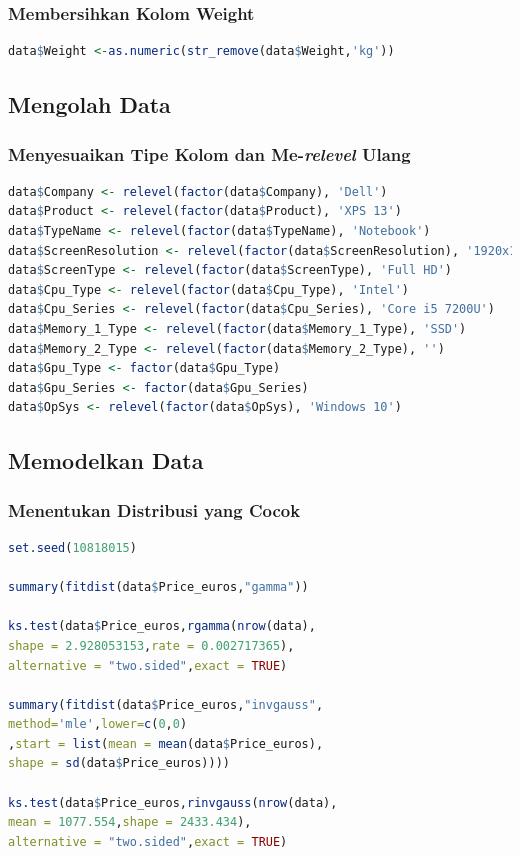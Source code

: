 \documentclass[12pt]{article}
\begin{document}
\subsubsection{Membersihkan Kolom Weight}
\begin{lstlisting}[language=R]
data$Weight <-as.numeric(str_remove(data$Weight,'kg'))
\end{lstlisting}
\subsection{Mengolah Data}
\subsubsection{Menyesuaikan Tipe Kolom dan Me-\textit{relevel} Ulang}
\begin{lstlisting}[language=R]
data$Company <- relevel(factor(data$Company), 'Dell')
data$Product <- relevel(factor(data$Product), 'XPS 13')
data$TypeName <- relevel(factor(data$TypeName), 'Notebook')
data$ScreenResolution <- relevel(factor(data$ScreenResolution), '1920x1080')
data$ScreenType <- relevel(factor(data$ScreenType), 'Full HD')
data$Cpu_Type <- relevel(factor(data$Cpu_Type), 'Intel')
data$Cpu_Series <- relevel(factor(data$Cpu_Series), 'Core i5 7200U')
data$Memory_1_Type <- relevel(factor(data$Memory_1_Type), 'SSD')
data$Memory_2_Type <- relevel(factor(data$Memory_2_Type), '')
data$Gpu_Type <- factor(data$Gpu_Type)
data$Gpu_Series <- factor(data$Gpu_Series)
data$OpSys <- relevel(factor(data$OpSys), 'Windows 10')
\end{lstlisting}
\subsection{Memodelkan Data}
\subsubsection{Menentukan Distribusi yang Cocok}
\begin{lstlisting}[language=R]
set.seed(10818015)

summary(fitdist(data$Price_euros,"gamma"))

ks.test(data$Price_euros,rgamma(nrow(data),
shape = 2.928053153,rate = 0.002717365),
alternative = "two.sided",exact = TRUE)

summary(fitdist(data$Price_euros,"invgauss",
method='mle',lower=c(0,0)
,start = list(mean = mean(data$Price_euros), 
shape = sd(data$Price_euros))))

ks.test(data$Price_euros,rinvgauss(nrow(data),
mean = 1077.554,shape = 2433.434),
alternative = "two.sided",exact = TRUE)
\end{lstlisting}
\end{document}
